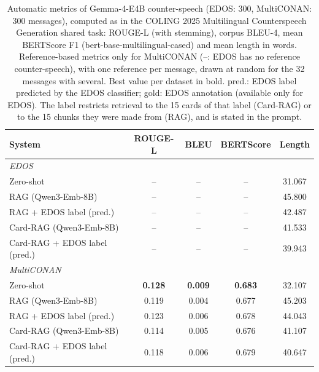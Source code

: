 \begin{table}[t]
\centering
\small
\caption{Automatic metrics of Gemma-4-E4B counter-speech (EDOS: 300, MultiCONAN: 300 messages), computed as in the COLING 2025 Multilingual Counterspeech Generation shared task: ROUGE-L (with stemming), corpus BLEU-4, mean BERTScore F1 (bert-base-multilingual-cased) and mean length in words. Reference-based metrics only for MultiCONAN (--: EDOS has no reference counter-speech), with one reference per message, drawn at random for the 32 messages with several. Best value per dataset in bold. pred.: EDOS label predicted by the EDOS classifier; gold: EDOS annotation (available only for EDOS). The label restricts retrieval to the 15 cards of that label (Card-RAG) or to the 15 chunks they were made from (RAG), and is stated in the prompt.}
\label{tab:automatic-metrics}
\begin{tabular}{lcccc}
\toprule
\textbf{System} & \textbf{ROUGE-L} & \textbf{BLEU} & \textbf{BERTScore} & \textbf{Length} \\
\midrule
\multicolumn{5}{l}{\textit{EDOS}} \\
Zero-shot & -- & -- & -- & 31.067 \\
RAG (Qwen3-Emb-8B) & -- & -- & -- & 45.800 \\
RAG + EDOS label (pred.) & -- & -- & -- & 42.487 \\
Card-RAG (Qwen3-Emb-8B) & -- & -- & -- & 41.533 \\
Card-RAG + EDOS label (pred.) & -- & -- & -- & 39.943 \\
\midrule
\multicolumn{5}{l}{\textit{MultiCONAN}} \\
Zero-shot & \textbf{0.128} & \textbf{0.009} & \textbf{0.683} & 32.107 \\
RAG (Qwen3-Emb-8B) & 0.119 & 0.004 & 0.677 & 45.203 \\
RAG + EDOS label (pred.) & 0.123 & 0.006 & 0.678 & 44.043 \\
Card-RAG (Qwen3-Emb-8B) & 0.114 & 0.005 & 0.676 & 41.107 \\
Card-RAG + EDOS label (pred.) & 0.118 & 0.006 & 0.679 & 40.647 \\
\bottomrule
\end{tabular}
\end{table}
